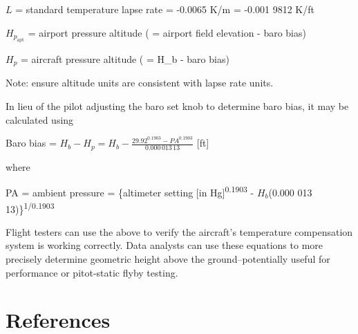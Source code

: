 \documentclass[
]{book}
\begin{document}
\(L\) = standard temperature lapse rate = -0.0065 K/m = -0.001 9812 K/ft

\(H_{p_{\mathrm{apt}}}\) = airport pressure altitude ( = airport field elevation - baro bias)

\(H_p\) = aircraft pressure altitude ( = H\_b - baro bias)

Note: ensure altitude units are consistent with lapse rate units.

In lieu of the pilot adjusting the baro set knob to determine baro bias, it may be calculated using

Baro bias = \(H_b - H_p = H_b - \frac{29.92^{0.1903} - PA^{0.1903}}{0.000\,013\,13}\) {[}ft{]}

where

PA = ambient pressure = \{altimeter setting {[}in Hg{]}\textsuperscript{0.1903} - \(H_b\)(0.000 013 13)\}\textsuperscript{1/0.1903}

Flight testers can use the above to verify the aircraft's temperature compensation system is working correctly. Data analysts can use these equations to more precisely determine geometric height above the ground--potentially useful for performance or pitot-static flyby testing.

\hypertarget{references-2}{%
\section{References}\label{references-2}}
\end{document}
